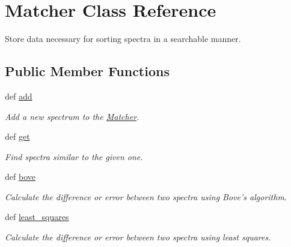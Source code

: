 \hypertarget{classbackend_1_1_matcher}{
\section{Matcher Class Reference}
\label{classbackend_1_1_matcher}
}


Store data necessary for sorting spectra in a searchable manner.  
\subsection*{Public Member Functions}
\begin{DoxyCompactItemize}
\item 
def \hyperlink{classbackend_1_1_matcher_a66aa7c8063db6217a0a0061f8b7ba206}{add}
\begin{DoxyCompactList}\small\item\em Add a new spectrum to the \hyperlink{classbackend_1_1_matcher}{Matcher}. \item\end{DoxyCompactList}\item 
def \hyperlink{classbackend_1_1_matcher_a444a1328efb32d5d9d2dcb2efe855d3b}{get}
\begin{DoxyCompactList}\small\item\em Find spectra similar to the given one. \item\end{DoxyCompactList}\item 
def \hyperlink{classbackend_1_1_matcher_a989553190033eaa893e27d2907fce91e}{bove}
\begin{DoxyCompactList}\small\item\em Calculate the difference or error between two spectra using Bove's algorithm. \item\end{DoxyCompactList}\item 
def \hyperlink{classbackend_1_1_matcher_ab324f6c7c11f54b7617ecdee14f76049}{least\_\-squares}
\begin{DoxyCompactList}\small\item\em Calculate the difference or error between two spectra using least squares. \item\end{DoxyCompactList}\end{DoxyCompactItemize}
